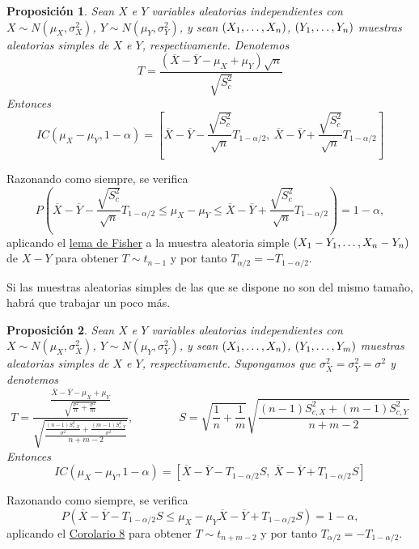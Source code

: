 \documentclass[11pt]{report}
\makeatletter
\renewenvironment{proof}[1][\proofname]{\par
  \pushQED{\qed}%
  \normalfont \topsep\z@skip %
  \trivlist
  \item[\hskip\labelsep
        \itshape
    #1\@addpunct{.}]\ignorespaces
}{%
  \popQED\endtrivlist\@endpefalse
}
\newtheorem{proposition}{Proposición}
\theoremstyle{definition}
\newcommand{\pars}[1]{\left( #1 \right)}
\makeatother
\begin{document}
\begin{proposition}
Sean $X$ e $Y$ variables aleatorias independientes con $X \sim N(\mu_X,\sigma^2_X)$, $Y \sim N(\mu_Y,\sigma^2_Y)$, y sean $(X_1,\mathellipsis,X_n)$, $(Y_1,\mathellipsis,Y_n)$ muestras aleatorias simples de $X$ e $Y$, respectivamente. Denotemos
\[T =\frac{(\overline{X}-\overline{Y}-\mu_X+\mu_Y)\sqrt{n}}{\sqrt{S^2_c}} \]
Entonces
\[IC(\mu_X-\mu_Y,1-\alpha) = \left[\overline{X}-\overline{Y}-\frac{\sqrt{S^2_c}}{\sqrt{n}}T_{1-\alpha/2}, \ \overline{X}-\overline{Y}+\frac{\sqrt{S^2_c}}{\sqrt{n}}T_{1-\alpha/2}\right]\]
\end{proposition}

\begin{proof}
Razonando como siempre, se verifica
\[P\pars{\overline{X}-\overline{Y}-\frac{\sqrt{S^2_c}}{\sqrt{n}}T_{1-\alpha/2} \leq \mu_X-\mu_Y \leq \overline{X}-\overline{Y}+\frac{\sqrt{S^2_c}}{\sqrt{n}}T_{1-\alpha/2}} = 1-\alpha,\]
aplicando el \hyperref[prop20]{\color{blue}lema de Fisher} a la muestra aleatoria simple  $(X_1-Y_1,\mathellipsis,X_n-Y_n)$ de $X-Y$ para obtener $T \sim t_{n-1}$ y por tanto $T_{\alpha/2} = -T_{1-\alpha/2}$.
\end{proof}

Si las muestras aleatorias simples de las que se dispone no son del mismo tamaño, habrá que trabajar un poco más.

\begin{proposition}
Sean $X$ e $Y$ variables aleatorias independientes con $X \sim N(\mu_X,\sigma^2_X)$, $Y \sim N(\mu_Y,\sigma^2_Y)$, y sean $(X_1,\mathellipsis,X_n)$, $(Y_1,\mathellipsis,Y_m)$ muestras aleatorias simples de $X$ e $Y$, respectivamente. Supongamos que $\sigma^2_X = \sigma^2_Y = \sigma^2$ y denotemos
\[T = \frac{\displaystyle \frac{\overline{X}-\overline{Y}-\mu_X+\mu_Y}{\sqrt{\frac{\sigma^2}{n}+\frac{\sigma^2}{m}}}}{\displaystyle \sqrt{\frac{\frac{(n-1)S^2_{c,X}}{\sigma^2}+\frac{(m-1)S^2_{c,Y}}{\sigma^2}}{n+m-2}}}, \qquad \qquad S =\sqrt{\frac{1}{n}+\frac{1}{m}}\sqrt{\frac{(n-1)S^2_{c,X}+(m-1)S^2_{c,Y}}{n+m-2}}\]
Entonces
\[IC(\mu_X-\mu_Y,1-\alpha) = \left[\overline{X}-\overline{Y}-T_{1-\alpha/2}S, \ \overline{X}-\overline{Y}+T_{1-\alpha/2}S\right]\]
\end{proposition}

\begin{proof}
Razonando como siempre, se verifica
\[P\pars{\overline{X}-\overline{Y}-T_{1-\alpha/2}S \leq \mu_X-\mu_Y\overline{X}-\overline{Y}+T_{1-\alpha/2}S} = 1-\alpha,\]
aplicando el \hyperref[cor8]{\color{blue}Corolario 8} para obtener $T \sim t_{n+m-2}$ y por tanto $T_{\alpha/2} = -T_{1-\alpha/2}$.
\end{proof}
\end{document}
